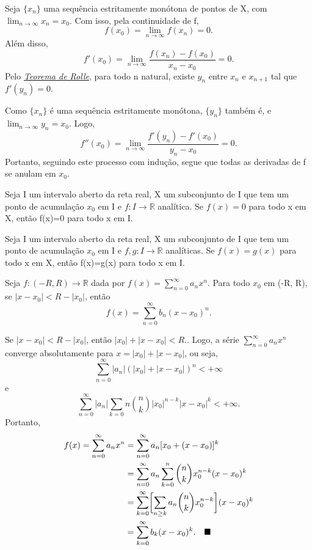 \documentclass[../analysis_notes.tex]{subfiles}
\begin{document}
\begin{proof*}
	Seja \(\{x_{n}\}\) uma sequência estritamente monótona de pontos de X, com \(\lim_{n\to \infty}x_{n}=x_{0}\). Com isso, pela continuidade de f,
	\[
		f(x_{0})=\lim_{n\to \infty}f(x_{n})=0.
	\]
	Além disso,
	\[
		f'(x_{0}) = \lim_{n\to \infty}\frac{f(x_{n})-f(x_{0})}{x_{n}-x_{0}}=0.
	\]
	Pelo \hyperlink{rolle}{\textit{Teorema de Rolle}}, para todo n natural, existe \(y_{n}\) entre \(x_{n}\) e \(x_{n+1}\) tal que \(f'(y_{n})=0\).

	Como \(\{x_{n}\}\) é uma sequência estritamente monótona, \(\{y_{n}\}\) também é, e \(\lim_{n\to \infty}y_{n}=x_{0}\). Logo,
	\[
		f''(x_{0})=\lim_{n\to \infty}\frac{f'(y_{n})-f'(x_{0})}{y_{n}-x_{0}}=0.
	\]
	Portanto, seguindo este processo com indução, segue que todas as derivadas de f se anulam em \(x_{0}\). \qedsymbol
\end{proof*}
\begin{theorem*}
	Seja I um intervalo aberto da reta real, X um subconjunto de I que tem um ponto de acumulação \(x_{0}\) em I e \(f:I\rightarrow \mathbb{R}\) analítica. Se \(f(x)=0\) para todo x em X, então f(x)=0 para todo x em I.
\end{theorem*}
\begin{crl*}
	Seja I um intervalo aberto da reta real, X um subconjunto de I que tem um ponto de acumulação \(x_{0}\) em I e \(f, g:I\rightarrow \mathbb{R}\) analíticas. Se \(f(x)=g(x)\) para todo x em X, então f(x)=g(x) para todo x em I.
\end{crl*}
\begin{theorem*}
	Seja \(f:(-R, R)\rightarrow \mathbb{R}\) dada por \(f(x)=\sum\limits_{n=0}^{\infty}a_{n}x^{n}\). Para todo \(x_{0}\) em (-R, R), se \(|x-x_{0}|<R-|x_{0}|\), então
	\[
		f(x)=\sum\limits_{n=0}^{\infty}b_{n}(x-x_{0})^{n}.
	\]
\end{theorem*}
\begin{proof*}
	Se \(|x-x_{0}|<R-|x_{0}|\), então \(|x_{0}|+|x-x_{0}|<R.\). Logo, a série \(\sum\limits_{n=0}^{\infty}a_{n}x^{n}\) converge absolutamente para \(x=|x_{0}|+|x-x_{0}|\), ou seja,
	\[
		\sum\limits_{n=0}^{\infty}|a_{n}|(|x_{0}|+|x-x_{0}|)^{n}<+\infty
	\]
	e
	\[
		\sum\limits_{n=0}^{\infty}|a_{n}|\sum\limits_{k=0}{n}\binom{n}{k}|x_{0}|^{n-k}|x-x_{0}|^{k}<+\infty.
	\]
	Portanto,
	\begin{align*}
		f(x)=\sum\limits_{n=0}^{\infty}a_{n}x^{n} & =\sum\limits_{n=0}^{\infty}a_{n}[x_{0}+(x-x_{0})]^{k}                                                       \\
		                                          & =\sum\limits_{n=0}^{\infty}a_{n}\sum\limits_{k=0}^{n}\binom{n}{k}x_{0}^{n-k}(x-x_{0})^{k}                   \\
		                                          & = \sum\limits_{k=0}^{\infty}\biggl[\sum\limits_{n\geq k}^{}a_{n}\binom{n}{k}x_{0}^{n-k}\biggr](x-x_{0})^{k} \\
		                                          & =\sum\limits_{k= 0}^{\infty}b_{k}(x-x_{0})^{k}.\quad \text{$\blacksquare$}
	\end{align*}
\end{proof*}
\end{document}
